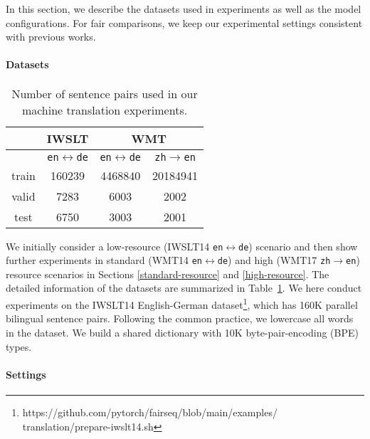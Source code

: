 \documentclass[11pt]{article}
\begin{document}
In this section, we describe the datasets used in experiments as well as the model configurations. For fair comparisons, we keep our experimental settings consistent with previous works.

\paragraph{Datasets}

\begin{table}[h]
\centering
\begin{tabular}{c|c|c|c} 
 & IWSLT & \multicolumn{2}{|c}{WMT} \\
\hline
\hline
& \texttt{en}$\leftrightarrow$\texttt{de} & \texttt{en}$\leftrightarrow$\texttt{de} & \texttt{zh}$\rightarrow$\texttt{en} \\
\hline
train & 160239 & 4468840 & 20184941 \\ 
valid & 7283 & 6003 & 2002 \\ 
test & 6750 & 3003 & 2001 \\ 
\hline
\end{tabular}
\caption{Number of sentence pairs used in our machine translation experiments.}
\label{statics}
\end{table}

We initially consider a low-resource (IWSLT14 \texttt{en}$\leftrightarrow$\texttt{de}) scenario and then show further experiments in standard (WMT14 \texttt{en}$\leftrightarrow$\texttt{de}) and high (WMT17 \texttt{zh}$\rightarrow$\texttt{en}) resource scenarios in Sections \ref{standard-resource} and \ref{high-resource}. The detailed information of the datasets are summarized in Table~\ref{statics}. We here conduct experiments on the IWSLT14 English-German dataset\footnote{https://github.com/pytorch/fairseq/blob/main/examples/ translation/prepare-iwslt14.sh}, which has 160K parallel bilingual sentence pairs. Following the common practice, we lowercase all words in the dataset. We build a shared dictionary with 10K byte-pair-encoding (BPE) \cite{sennrich2015neural} types.

\paragraph{Settings}
\end{document}
